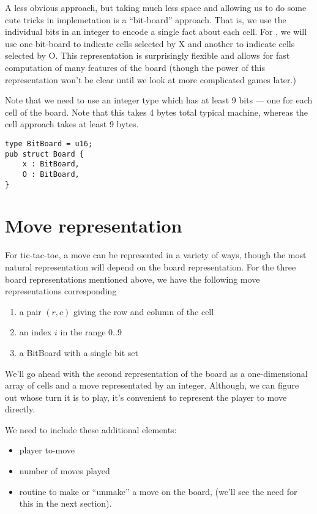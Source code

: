 \documentclass[10pt,dvipdfmx]{report}
\newcommand{\g}[1]{{\sc{#1}}\index{{\sc{#1}}}}
\begin{document}
A less obvious approach, but taking much less space and allowing us to do some cute tricks
in implemetation is a ``bit-board'' approach.  That is, we use the individual bits in an integer
to encode a single fact about each cell.  For \g{tic-tac-toe}, we will use one bit-board to
indicate cells selected by X and another to indicate cells selected by O.
This representation is surprisingly flexible and allows for fast computation of many
features of the board (though the power of this representation won't be clear until
we look at more complicated games later.)

Note that we need to use an integer type which has at least 9 bits --- one for each cell
of the board.  Note that this takes 4 bytes total typical machine, whereas the cell approach
takes at least 9 bytes.
\begin{verbatim}
type BitBoard = u16;
pub struct Board {
    x : BitBoard,
    O : BitBoard,
}
\end{verbatim}

\section{Move representation}
For tic-tac-toe, a move can be represented in a variety of ways, though the most
natural representation will depend on the board representation.  For the three board representations
mentioned above, we have the following move representations corresponding
\begin{enumerate}
\item a pair $(r,c)$ giving the row and column of the cell
\item an index $i$ in the range $0..9$
\item a BitBoard with a single bit set
\end{enumerate}

We'll go ahead with the second representation of the board as a one-dimensional array of cells
and a move representated by an integer.  Although, we can figure out whose turn it is to play,
it's convenient to represent the player to move directly.

We need to include these additional elements:
\begin{itemize}
\item player to-move
\item number of moves played
\item routine to make or ``unmake'' a move on the board, (we'll see the need for this in the next section).
\end{itemize}
\end{document}

